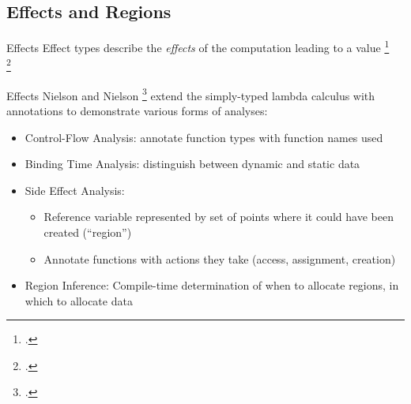 \documentclass[aspectratio=169]{beamer}
\begin{document}
\subsection{Effects and Regions}

\begin{frame}{Effects}
    Effect types describe the \emph{effects} of the computation leading to a value \footcite{pierce_advanced_2005}
    \\
    \footcite{lucassen_polymorphic_1988}
\end{frame}

\begin{frame}{Effects}
    Nielson and Nielson \footcite{nielson_type_1999} extend the simply-typed lambda calculus with annotations to demonstrate various forms of analyses:
    \begin{itemize}
        \item Control-Flow Analysis: annotate function types with function names used
        \item Binding Time Analysis: distinguish between dynamic and static data
        \item Side Effect Analysis:
            \begin{itemize}
                \item Reference variable represented by set of points where it could have been created (``region'')
                \item Annotate functions with actions they take (access, assignment, creation)
            \end{itemize}
        \item Region Inference: Compile-time determination of when to allocate regions, in which to allocate data
    \end{itemize}
\end{frame}
\end{document}
